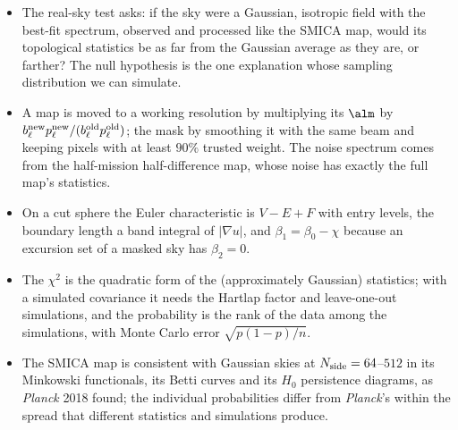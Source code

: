 \begin{recap}
\begin{itemize}
  \item The real-sky test asks: if the sky were a Gaussian, isotropic field with the best-fit spectrum, observed and
        processed like the SMICA map, would its topological statistics be as far from the Gaussian average as they
        are, or farther? The null hypothesis is the one explanation whose sampling distribution we can simulate.
  \item A map is moved to a working resolution by multiplying its $\alm$ by $b^{\rm new}_\ell p^{\rm new}_\ell/(b^{\rm old}_\ell p^{\rm old}_\ell)$;
        the mask by smoothing it with the same beam and keeping pixels with at least $90\%$ trusted weight. The noise
        spectrum comes from the half-mission half-difference map, whose noise has exactly the full map's statistics.
  \item On a cut sphere the Euler characteristic is $V-E+F$ with entry levels, the boundary length a band integral of
        $|\nabla u|$, and $\beta_1=\beta_0-\chi$ because an excursion set of a masked sky has $\beta_2=0$.
  \item The $\chi^2$ is the quadratic form of the (approximately Gaussian) statistics; with a simulated covariance it
        needs the Hartlap factor and leave-one-out simulations, and the probability is the rank of the data among the
        simulations, with Monte Carlo error $\sqrt{p(1-p)/n}$.
  \item The SMICA map is consistent with Gaussian skies at $N_{\rm side}=64$--$512$ in its Minkowski functionals, its Betti curves
        and its $H_0$ persistence diagrams, as \textit{Planck} 2018 found; the individual probabilities differ from
        \textit{Planck}'s within the spread that different statistics and simulations produce.
\end{itemize}
\end{recap}
\providecommand{\CmNfile}{}\renewcommand{\CmNfile}{230{,}831}
\providecommand{\CmNgal}{}\renewcommand{\CmNgal}{208{,}426}
\providecommand{\CmNranFile}{}\renewcommand{\CmNranFile}{11{,}636{,}252}
\providecommand{\CmNranCut}{}\renewcommand{\CmNranCut}{10{,}507{,}945}
\providecommand{\CmNran}{}\renewcommand{\CmNran}{2{,}084{,}260}
\providecommand{\CmRanRatio}{}\renewcommand{\CmRanRatio}{10}
\providecommand{\CmZeff}{}\renewcommand{\CmZeff}{0.565}
\providecommand{\CmDcMin}{}\renewcommand{\CmDcMin}{1153}
\providecommand{\CmDcMax}{}\renewcommand{\CmDcMax}{1742}
\providecommand{\CmDcEff}{}\renewcommand{\CmDcEff}{1460}

